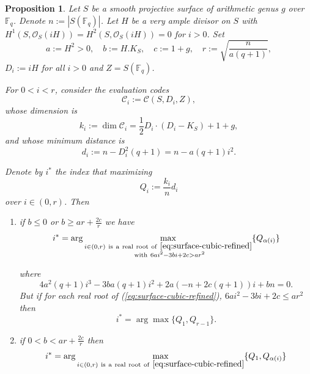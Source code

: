 \documentclass[14pt]{amsart}
\theoremstyle{plain}
\newtheorem{prop}[thm]{\bf Proposition}
\theoremstyle{definition}
\theoremstyle{remark}
\theoremstyle{example}
\def \O{\mathcal{O}}
\begin{document}
\begin{prop}
\label{prop:surface-optimal-i-refined}
Let $S$ be a smooth projective surface of arithmetic genus $g$ over $\mathbb{F}_q$. Denote $n := |S(\mathbb{F}_q)|$. Let $H$ be a very ample divisor on $S$ with $H^1(S,\O_S(iH))=H^2(S,\O_S(iH))=0$ for $i>0$. Set
$$a:=H^2>0,\quad b:=H.K_S,\quad c:=1+g,\quad r:=\sqrt{\frac{n}{a(q+1)}},$$
$D_i:=iH$ for all $i>0$ and $Z = S(\mathbb{F}_q)$.

For $0< i < r$, consider the evaluation codes
\[
\mathcal{C}_i := \mathcal{C}(S,D_i,Z),
\] 
whose dimension is
\[
k_i := \dim \mathcal{C}_i = \frac{1}{2} D_i \cdot (D_i - K_S) + 1 + g,
\]
and whose minimum distance is
\[
d_i := n - D_i^2 (q+1) = n - a(q+1)i^2.
\]

Denote by $i^*$ the index that maximizing 
\[
Q_i:= \frac{k_i}{n} d_i
\]
over $i \in (0,r)$. Then 

\begin{enumerate}
\item if $b\leq 0$ or $b\geq ar+\frac{2c}{r}$ we have
\[
i^* = \arg\max_{\substack{
i\in (0,r) \mathrm{\ is\ a\ real\ root\ of\ } \eqref{eq:surface-cubic-refined} \\
\mathrm{\ with}\ 6ai^2 - 3bi + 2c > ar^2
}} \{Q_{\alpha(i)}\}
\]

where
\begin{equation}
\label{eq:surface-cubic-refined}
4 a^2 (q+1) i^3 - 3 b a (q+1) i^2 + 2 a (-n + 2c(q+1)) i + b n = 0.
\end{equation}
But if for each real root of (\ref{eq:surface-cubic-refined}), $6ai^2-3bi+2c\leq ar^2$ then 
$$i^*= \arg \max\{Q_1,Q_{r-1}\}.$$

\item if $0< b< ar+\frac{2c}{r}$ then
\[
i^* = \arg\max_{\substack{
i\in (0,r) \mathrm{\ is\ a\ real\ root\ of\ } \eqref{eq:surface-cubic-refined}
}} \{Q_1,Q_{\alpha(i)}\}
\]
\end{enumerate}
 
\end{prop}
\end{document}
